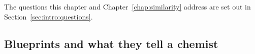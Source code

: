 The questions this chapter and Chapter~\ref{chap:similarity} address are set out in Section~\ref{sec:intro:questions}.


\subsection{Blueprints and what they tell a chemist}


